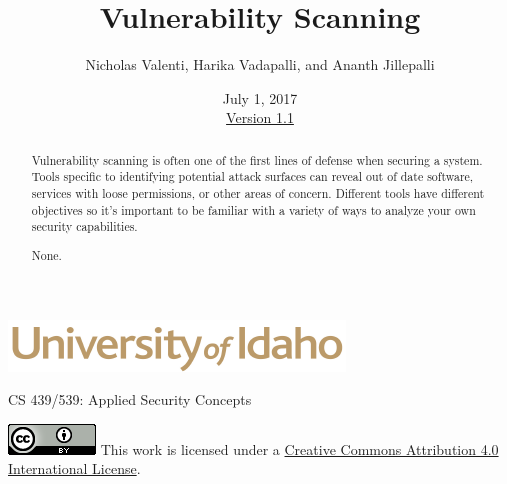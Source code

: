 \documentclass[12pt]{extarticle}
\begin{document}
\title{ Vulnerability Scanning }
\author{Nicholas Valenti, Harika Vadapalli, and Ananth Jillepalli}
\date{July 1, 2017 \\ \hyperref[changelog]{Version 1.1}} %
\renewcommand{\abstractname}{Executive Summary}
\begin{titlepage}
\maketitle
{}
\begin{center}
\includegraphics[scale=.5]{UofI}

\large{CS 439/539: Applied Security Concepts}

\vskip 40pt

\end{center}
\begin{abstract}

Vulnerability scanning is often one of the first lines of defense when securing a system. Tools specific to identifying potential attack surfaces can reveal out of date software, services with loose permissions, or other areas of concern. Different tools have different objectives so it's important to be familiar with a variety of ways to analyze your own security capabilities.


None.
\end{abstract}


\vfill
\begin{center}
	\includegraphics[scale=0.5]{cc}
	\vskip 10pt
	This work is licensed under a \href{https://creativecommons.org/licenses/by/4.0/}{Creative Commons Attribution 4.0 International License}.
\end{center}

\end{titlepage}


\pagebreak
\tableofcontents

\end{document}
